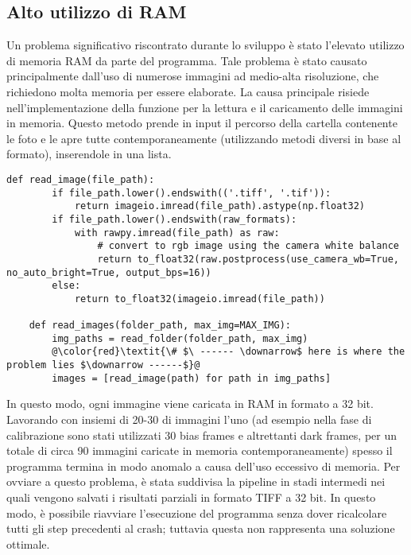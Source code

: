 \subsection{Alto utilizzo di RAM}

Un problema significativo riscontrato durante lo sviluppo è stato l'elevato utilizzo di memoria RAM da parte del programma. Tale problema è stato causato principalmente dall'uso di numerose immagini ad medio-alta risoluzione, che richiedono molta memoria per essere elaborate. La causa principale risiede nell'implementazione della funzione per la lettura e il caricamento delle immagini in memoria. Questo metodo prende in input il percorso della cartella contenente le foto e le apre tutte contemporaneamente (utilizzando metodi diversi in base al formato), inserendole in una lista.

\begin{lstlisting}[label={lst:read_images}]
    def read_image(file_path):
        if file_path.lower().endswith(('.tiff', '.tif')):
            return imageio.imread(file_path).astype(np.float32)
        if file_path.lower().endswith(raw_formats):
            with rawpy.imread(file_path) as raw:
                # convert to rgb image using the camera white balance
                return to_float32(raw.postprocess(use_camera_wb=True, no_auto_bright=True, output_bps=16))
        else:
            return to_float32(imageio.imread(file_path))

    def read_images(folder_path, max_img=MAX_IMG):
        img_paths = read_folder(folder_path, max_img)
        @\color{red}\textit{\# $\ ------ \downarrow$ here is where the problem lies $\downarrow ------$}@
        images = [read_image(path) for path in img_paths]
\end{lstlisting}

In questo modo, ogni immagine viene caricata in RAM in formato a 32 bit. Lavorando con insiemi di 20-30 di immagini l'uno (ad esempio nella fase di calibrazione sono stati utilizzati 30 bias frames e altrettanti dark frames, per un totale di circa 90 immagini caricate in memoria contemporaneamente) spesso il programma termina in modo anomalo a causa dell'uso eccessivo di memoria. Per ovviare a questo problema, è stata suddivisa la pipeline in stadi intermedi nei quali vengono salvati i risultati parziali in formato TIFF a 32 bit. In questo modo, è possibile riavviare l'esecuzione del programma senza dover ricalcolare tutti gli step precedenti al crash; tuttavia questa non rappresenta una soluzione ottimale.

